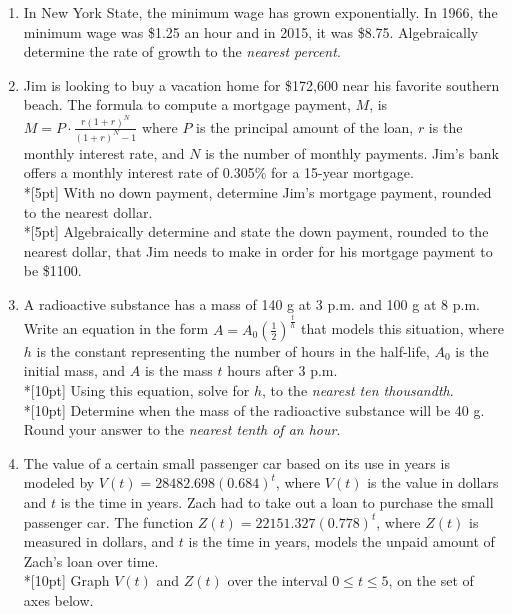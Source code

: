 \documentclass[12pt, oneside]{article}
\begin{document}
\begin{enumerate}

  \item %
  In New York State, the minimum wage has grown exponentially. In 1966, the minimum wage was \$1.25 an hour and in 2015, it was \$8.75. Algebraically determine the rate of growth to the \textit{nearest percent}.

  \item %
  Jim is looking to buy a vacation home for \$172,600 near his favorite southern beach. The formula to compute a mortgage payment, $M$, is $\displaystyle M=P \cdot \frac{r(1+r)^N}{(1+r)^N-1}$ where $P$ is the principal amount of the loan, $r$ is the monthly interest rate, and $N$ is the number of monthly payments. Jim's bank offers a monthly interest rate of 0.305\% for a 15-year mortgage.\\*[5pt]
  With no down payment, determine Jim's mortgage payment, rounded to the nearest dollar.\\*[5pt]
  Algebraically determine and state the down payment, rounded to the nearest dollar, that Jim needs to make in order for his mortgage payment to be \$1100.

  \item %
  A radioactive substance has a mass of 140 g at 3 p.m. and 100 g at 8 p.m. Write an equation in the form $\displaystyle A = A_0 \left( \frac{1}{2}\right) ^\frac{t}{h}$ that models this situation, where $h$ is the constant representing the number of hours in the half-life, $A_0$ is the initial mass, and $A$ is the mass $t$ hours after 3 p.m.\\*[10pt]
  Using this equation, solve for $h$, to the \textit{nearest ten thousandth}.\\*[10pt]
  Determine when the mass of the radioactive substance will be 40 g. Round your answer to the \textit{nearest tenth of an hour}.

  \newpage %
  \item %
  The value of a certain small passenger car based on its use in years is modeled by $V(t) =28482.698(0.684)^t$,
  where $V(t)$ is the value in dollars and $t$ is the time in years.
  Zach had to take out a loan to purchase the small passenger car. The function $Z(t) = 22151.327(0.778)^t$, where $Z(t)$ is measured in dollars,
  and $t$ is the time in years, models the unpaid amount of Zach's loan over time.\\*[10pt]
  Graph $V(t)$ and $Z(t)$ over the interval $0 \leq t \leq 5$, on the set of axes below.


\end{enumerate}
\end{document}
